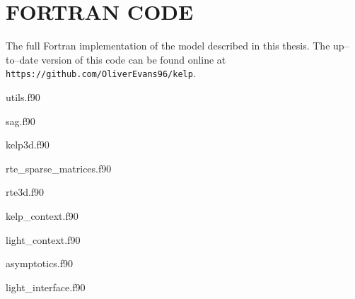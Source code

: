 \chapter{FORTRAN CODE}
\label{chap:fortran}

The full Fortran implementation of the model described in this thesis.
The up--to--date version of this code can be found online at
\texttt{https://github.com/OliverEvans96/kelp}.

utils.f90


sag.f90


kelp3d.f90


rte\_sparse\_matrices.f90


rte3d.f90


kelp\_context.f90


light\_context.f90


asymptotics.f90


light\_interface.f90


